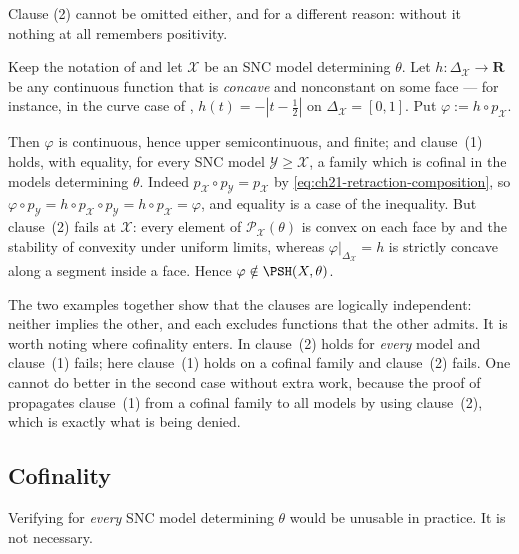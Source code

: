 Clause (2) cannot be omitted either, and for a different reason: without it
nothing at all remembers positivity.

\begin{example}
\label{ex:ch21-clause-two-needed}
Keep the notation of  and let \(\mathcal X\)
be an SNC model determining \(\theta\).  Let \(h:\Delta_{\mathcal X}\to
\mathbf R\) be any continuous function that is \emph{concave} and
nonconstant on some face --- for instance, in the curve case of
, \(h(t)=-|t-\tfrac12|\) on
\(\Delta_{\mathcal X}=[0,1]\).  Put \(\varphi:=h\circ p_{\mathcal X}\).

Then \(\varphi\) is continuous, hence upper semicontinuous, and finite; and
clause~(1) holds, with equality, for every SNC model
\(\mathcal Y\geq\mathcal X\), a family which is cofinal in the models
determining \(\theta\).  Indeed
\(p_{\mathcal X}\circ p_{\mathcal Y}=p_{\mathcal X}\) by
\eqref{eq:ch21-retraction-composition}, so \(\varphi\circ p_{\mathcal Y}=
h\circ p_{\mathcal X}\circ p_{\mathcal Y}=h\circ p_{\mathcal X}=\varphi\),
and equality is a case of the inequality.  But clause~(2) fails at
\(\mathcal X\): every element of \(\mathcal P_{\mathcal X}(\theta)\) is
convex on each face by
 and the stability of convexity
under uniform limits, whereas
\(\varphi|_{\Delta_{\mathcal X}}=h\) is strictly concave along a segment
inside a face.  Hence \(\varphi\notin\PSH(X,\theta)\).

The two examples together show that the clauses are logically independent:
neither implies the other, and each excludes functions that the other
admits.  It is worth noting where cofinality enters.  In
 clause~(2) holds for \emph{every} model and
clause~(1) fails; here clause~(1) holds on a cofinal family and clause~(2)
fails.  One cannot do better in the second case without extra work, because
the proof of  propagates clause~(1)
from a cofinal family to all models by using clause~(2), which is exactly
what is being denied.
\end{example}

\subsection{Cofinality}
\label{sec:ch21-cofinality}

Verifying  for \emph{every} SNC model determining
\(\theta\) would be unusable in practice.  It is not necessary.

